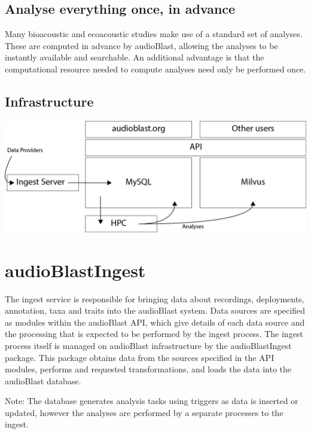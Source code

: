 \documentclass[
]{book}
\begin{document}
\hypertarget{analyse-everything-once-in-advance}{%
\section{Analyse everything once, in advance}\label{analyse-everything-once-in-advance}}

Many bioacoustic and ecoacoustic studies make use of a standard set of analyses. These are computed in advance by audioBlast, allowing the analyses to be instantly available and searchable. An additional advantage is that the computational resource needed to compute analyses need only be performed once.

\hypertarget{infrastructure}{%
\section{Infrastructure}\label{infrastructure}}

\includegraphics{images/infrastructure.png}

\hypertarget{audioblastingest}{%
\chapter{audioBlastIngest}\label{audioblastingest}}

The ingest service is responsible for bringing data about recordings, deployments, annotation, taxa and traits into the audioBlast system. Data sources are specified as modules within the audioBlast API, which give details of each data source and the processing that is expected to be performed by the ingest process. The ingest process itself is managed on audioBlast infrastructure by the audioBlastIngest package. This package obtains data from the sources specified in the API modules, performs and requested transformations, and loads the data into the audioBlast database.

Note: The database generates analysis tasks using triggers as data is inserted or updated, however the analyses are performed by a separate processes to the ingest.
\end{document}
